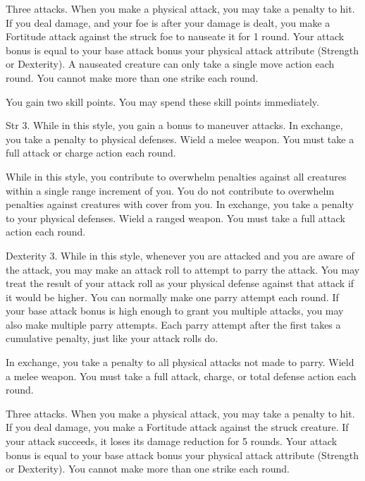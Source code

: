 \featpre Three attacks.
\featben When you make a physical attack, you may take a  penalty to hit.
If you deal damage, and your foe is \bloodied after your damage is dealt, you make a Fortitude attack against the struck foe to nauseate it for 1 round.
Your attack bonus is equal to your base attack bonus \add your physical attack attribute (Strength or Dexterity).
A nauseated creature can only take a single move action each round.
You cannot make more than one strike each round.

\featben You gain two skill points.
You may spend these skill points immediately.

\featpres Str 3.
\featben While in this style, you gain a  bonus to maneuver attacks.
In exchange, you take a  penalty to physical defenses.
\stylereq Wield a melee weapon.
You must take a full attack or charge action each round.

\featben While in this style, you contribute to overwhelm penalties against all creatures within a single range increment of you.
You do not contribute to overwhelm penalties against creatures with cover from you.
In exchange, you take a  penalty to your physical defenses.
\stylereq Wield a ranged weapon.
You must take a full attack action each round.

\featpre Dexterity 3.
\featben While in this style, whenever you are attacked and you are aware of the attack, you may make an attack roll to attempt to parry the attack.
You may treat the result of your attack roll as your physical defense against that attack if it would be higher.
You can normally make one parry attempt each round.
If your base attack bonus is high enough to grant you multiple attacks, you may also make multiple parry attempts.
Each parry attempt after the first takes a cumulative  penalty, just like your attack rolls do.

In exchange, you take a  penalty to all physical attacks not made to parry.
\stylereq Wield a melee weapon.
You must take a full attack, charge, or total defense action each round.

\featpre Three attacks.
\featben When you make a physical attack, you may take a  penalty to hit.
If you deal damage, you make a Fortitude attack against the struck creature.
If your attack succeeds, it loses its damage reduction for 5 rounds.
Your attack bonus is equal to your base attack bonus \add your physical attack attribute (Strength or Dexterity).
You cannot make more than one strike each round.


